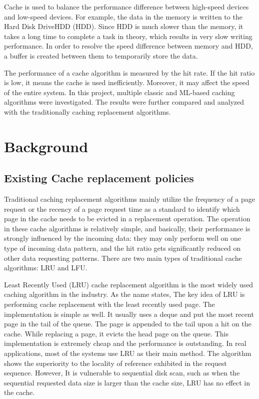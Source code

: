 \documentclass[letterpaper,twocolumn,10pt]{article}
\begin{document}
Cache is used to balance the performance difference between high-speed devices and low-speed devices. For example, the data in the memory is written to the Hard Disk DriveHDD (HDD). Since HDD is much slower than the memory, it takes a long time to complete a task in theory, which results in very slow writing performance. In order to resolve the speed difference between memory and HDD, a buffer is created between them to temporarily store the data. 

The performance of a cache algorithm is measured by the hit rate. If the hit ratio is low, it means the cache is used inefficiently. Moreover, it may affect the speed of the entire system. In this project, multiple classic and ML-based caching algorithms were investigated. The results were further compared and analyzed with the traditionally caching replacement algorithms.

\section{Background}

\subsection{Existing Cache replacement policies}
Traditional caching replacement algorithms mainly utilize the frequency of a page request or the recency of a page request time as a standard to identify which page in the cache needs to be evicted in a replacement operation. The operation in these cache algorithms is relatively simple, and basically, their performance is strongly influenced by the incoming data: they may only perform well on one type of incoming data pattern, and the hit ratio gets significantly reduced on other data requesting patterns. There are two main types of traditional cache algorithms: LRU and LFU.

Least Recently Used (LRU) cache replacement algorithm is the most widely used caching algorithm in the industry. As the name states, The key idea of LRU is performing cache replacement with the least recently used page\cite{mattson1970evaluation}. The implementation is simple as well. It usually uses a deque\cite{WinNT} and put the most recent page in the tail of the queue. The page is appended to the tail upon a hit on the cache. While replacing a page, it evicts the head page on the queue. This implementation is extremely cheap and the performance is outstanding. In real applications, most of the systems use LRU as their main method. The algorithm shows the superiority to the locality of reference exhibited in the request sequence. However, It is vulnerable to sequential disk scan, such as when the sequential requested data size is larger than the cache size, LRU has no effect in the cache. 
\end{document}
